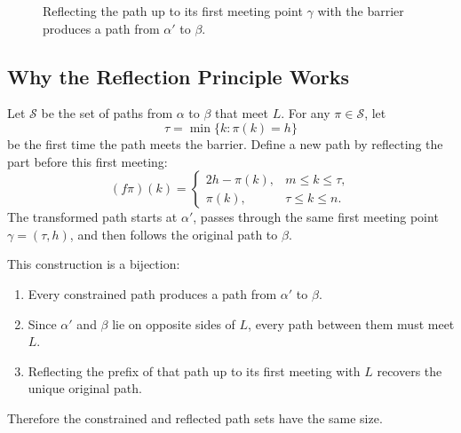 \documentclass[12pt,openany]{book}
\theoremstyle{definition}
\theoremstyle{remark}
\begin{document}
\begin{figure}[H]
\centering
{}
\caption{Reflecting the path up to its first meeting point \(\gamma\) with
the barrier produces a path from \(\alpha'\) to \(\beta\).}
\label{fig:random-walk-reflection-principle}
\end{figure}

\subsection{Why the Reflection Principle Works}

Let \(\mathcal{S}\) be the set of paths from \(\alpha\) to \(\beta\) that
meet \(L\). For any \(\pi\in\mathcal{S}\), let
\[
\tau=\min\{k:\pi(k)=h\}
\]
be the first time the path meets the barrier. Define a new path by reflecting
the part before this first meeting:
\[
(f\pi)(k)
=
\begin{cases}
2h-\pi(k), & m\leq k\leq\tau,\\
\pi(k), & \tau\leq k\leq n.
\end{cases}
\]
The transformed path starts at \(\alpha'\), passes through the same first
meeting point \(\gamma=(\tau,h)\), and then follows the original path to
\(\beta\).

This construction is a bijection:
\begin{enumerate}
    \item Every constrained path produces a path from \(\alpha'\) to
    \(\beta\).
    \item Since \(\alpha'\) and \(\beta\) lie on opposite sides of \(L\),
    every path between them must meet \(L\).
    \item Reflecting the prefix of that path up to its first meeting with
    \(L\) recovers the unique original path.
\end{enumerate}
Therefore the constrained and reflected path sets have the same size.
\end{document}
